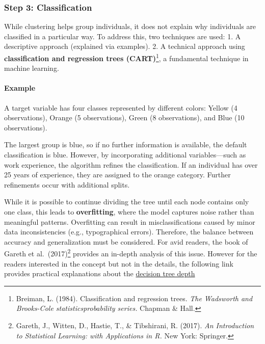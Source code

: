 \documentclass[
]{article}
\begin{document}
\subsubsection{Step 3: Classification}\label{step-3-classification}

While clustering helps group individuals, it does not explain why
individuals are classified in a particular way. To address this, two
techniques are used: 1. A descriptive approach (explained via examples).
2. A technical approach using \textbf{classification and regression
trees (CART)}\footnote{Breiman, L. (1984). Classification and regression
  trees. \emph{The Wadsworth and Brooks-Cole statisticsprobability
  series.} Chapman \& Hall.}, a fundamental technique in machine
learning.

\paragraph{Example}\label{example-1}

A target variable has four classes represented by different colors:
Yellow (4 observations), Orange (5 observations), Green (8
observations), and Blue (10 observations).

The largest group is blue, so if no further information is available,
the default classification is blue. However, by incorporating additional
variables---such as work experience, the algorithm refines the
classification. If an individual has over 25 years of experience, they
are assigned to the orange category. Further refinements occur with
additional splits.

While it is possible to continue dividing the tree until each node
contains only one class, this leads to \textbf{overfitting}, where the
model captures noise rather than meaningful patterns. Overfitting can
result in misclassifications caused by minor data inconsistencies (e.g.,
typographical errors). Therefore, the balance between accuracy and
generalization must be considered. For avid readers, the book of Gareth
et al.~(2017)\footnote{Gareth, J., Witten, D., Hastie, T., \&
  Tibshirani, R. (2017). \emph{An Introduction to Statistical Learning:
  with Applications in R.} New York: Springer.} provides an in-depth
analysis of this issue. However for the readers interested in the
concept but not in the details, the following link provides practical
explanations about the
\href{https://towardsdatascience.com/how-to-find-decision-tree-depth-via-cross-validation-2bf143f0f3d6.}{decision
tree depth}
\end{document}
